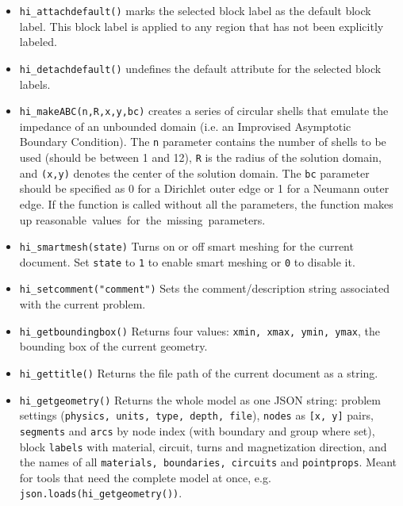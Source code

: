 \begin{itemize}
\item{\tt hi\_attachdefault()} marks the
selected block label as the default block label.  This block label
is applied to any region that has not been explicitly labeled.

\item{\tt hi\_detachdefault()} undefines the default
attribute for the selected block labels.

\item{\tt hi\_makeABC(n,R,x,y,bc)} creates a series of circular shells that emulate the
impedance of an unbounded domain (i.e. an Improvised Asymptotic Boundary
Condition).  The {\tt n} parameter contains the number of shells to be used
(should be between 1 and 12), {\tt R} is the radius of the solution domain, and
{\tt (x,y)} denotes the center of the solution domain.  The {\tt bc} parameter should
be specified as 0 for a Dirichlet outer edge or 1 for a Neumann outer edge.
If the function is called without all the parameters, the function makes up
reasonable values for the missing parameters. 

\item{\tt hi\_smartmesh(state)} Turns on or off smart meshing for the current document.  Set {\tt state} to {\tt 1} to enable smart meshing or {\tt 0} to disable it.

\item{\tt hi\_setcomment("comment")} Sets the comment/description string associated with the current problem.

\item{\tt hi\_getboundingbox()} Returns four values: {\tt xmin, xmax, ymin, ymax}, the bounding box of the current geometry.

\item{\tt hi\_gettitle()} Returns the file path of the current document as a string.

\item{\tt hi\_getgeometry()} Returns the whole model as one JSON string: problem settings ({\tt physics, units, type, depth, file}), {\tt nodes} as {\tt [x, y]} pairs, {\tt segments} and {\tt arcs} by node index (with boundary and group where set), block {\tt labels} with material, circuit, turns and magnetization direction, and the names of all {\tt materials, boundaries, circuits} and {\tt pointprops}. Meant for tools that need the complete model at once, e.g. {\tt json.loads(hi\_getgeometry())}.

\end{itemize}

